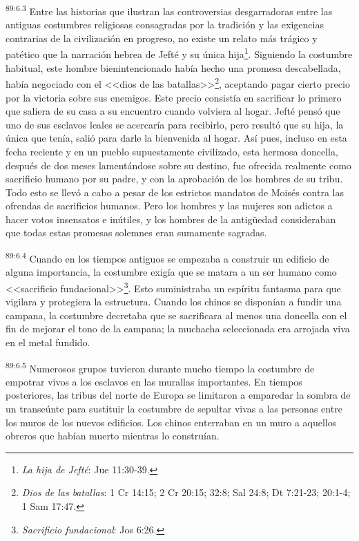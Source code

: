 \par
\textsuperscript{89:6.3} Entre las historias que ilustran las controversias desgarradoras entre las antiguas costumbres religiosas consagradas por la tradición y las exigencias contrarias de la civilización en progreso, no existe un relato más trágico y patético que la narración hebrea de Jefté y su única hija\footnote{\textit{La hija de Jefté}: Jue 11:30-39.}. Siguiendo la costumbre habitual, este hombre bienintencionado había hecho una promesa descabellada, había negociado con el <<dios de las batallas>>\footnote{\textit{Dios de las batallas}: 1 Cr 14:15; 2 Cr 20:15; 32:8; Sal 24:8; Dt 7:21-23; 20:1-4; 1 Sam 17:47.}, aceptando pagar cierto precio por la victoria sobre sus enemigos. Este precio consistía en sacrificar lo primero que saliera de su casa a su encuentro cuando volviera al hogar. Jefté pensó que uno de sus esclavos leales se acercaría para recibirlo, pero resultó que su hija, la única que tenía, salió para darle la bienvenida al hogar. Así pues, incluso en esta fecha reciente y en un pueblo supuestamente civilizado, esta hermosa doncella, después de dos meses lamentándose sobre su destino, fue ofrecida realmente como sacrificio humano por su padre, y con la aprobación de los hombres de su tribu. Todo esto se llevó a cabo a pesar de los estrictos mandatos de Moisés contra las ofrendas de sacrificios humanos. Pero los hombres y las mujeres son adictos a hacer votos insensatos e inútiles, y los hombres de la antig\"uedad consideraban que todas estas promesas solemnes eran sumamente sagradas.

\par
\textsuperscript{89:6.4} Cuando en los tiempos antiguos se empezaba a construir un edificio de alguna importancia, la costumbre exigía que se matara a un ser humano como <<sacrificio fundacional>>\footnote{\textit{Sacrificio fundacional}: Jos 6:26.}. Esto suministraba un espíritu fantasma para que vigilara y protegiera la estructura. Cuando los chinos se disponían a fundir una campana, la costumbre decretaba que se sacrificara al menos una doncella con el fin de mejorar el tono de la campana; la muchacha seleccionada era arrojada viva en el metal fundido.

\par
\textsuperscript{89:6.5} Numerosos grupos tuvieron durante mucho tiempo la costumbre de empotrar vivos a los esclavos en las murallas importantes. En tiempos posteriores, las tribus del norte de Europa se limitaron a emparedar la sombra de un transeúnte para sustituir la costumbre de sepultar vivas a las personas entre los muros de los nuevos edificios. Los chinos enterraban en un muro a aquellos obreros que habían muerto mientras lo construían.

